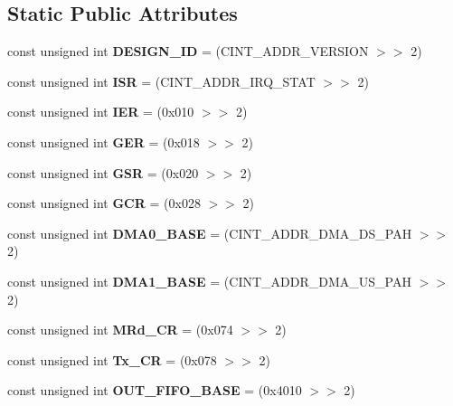 \subsection*{Static Public Attributes}
\begin{CompactItemize}
\item 
\hypertarget{classmprace_1_1ABB_s0}{
const unsigned int {\bf DESIGN\_\-ID} = (CINT\_\-ADDR\_\-VERSION $>$$>$ 2)}
\label{classmprace_1_1ABB_s0}

\item 
\hypertarget{classmprace_1_1ABB_s1}{
const unsigned int {\bf ISR} = (CINT\_\-ADDR\_\-IRQ\_\-STAT $>$$>$ 2)}
\label{classmprace_1_1ABB_s1}

\item 
\hypertarget{classmprace_1_1ABB_s2}{
const unsigned int {\bf IER} = (0x010 $>$$>$ 2)}
\label{classmprace_1_1ABB_s2}

\item 
\hypertarget{classmprace_1_1ABB_s3}{
const unsigned int {\bf GER} = (0x018 $>$$>$ 2)}
\label{classmprace_1_1ABB_s3}

\item 
\hypertarget{classmprace_1_1ABB_s4}{
const unsigned int {\bf GSR} = (0x020 $>$$>$ 2)}
\label{classmprace_1_1ABB_s4}

\item 
\hypertarget{classmprace_1_1ABB_s5}{
const unsigned int {\bf GCR} = (0x028 $>$$>$ 2)}
\label{classmprace_1_1ABB_s5}

\item 
\hypertarget{classmprace_1_1ABB_s6}{
const unsigned int {\bf DMA0\_\-BASE} = (CINT\_\-ADDR\_\-DMA\_\-DS\_\-PAH $>$$>$ 2)}
\label{classmprace_1_1ABB_s6}

\item 
\hypertarget{classmprace_1_1ABB_s7}{
const unsigned int {\bf DMA1\_\-BASE} = (CINT\_\-ADDR\_\-DMA\_\-US\_\-PAH $>$$>$ 2)}
\label{classmprace_1_1ABB_s7}

\item 
\hypertarget{classmprace_1_1ABB_s8}{
const unsigned int {\bf MRd\_\-CR} = (0x074 $>$$>$ 2)}
\label{classmprace_1_1ABB_s8}

\item 
\hypertarget{classmprace_1_1ABB_s9}{
const unsigned int {\bf Tx\_\-CR} = (0x078 $>$$>$ 2)}
\label{classmprace_1_1ABB_s9}

\item 
\hypertarget{classmprace_1_1ABB_s10}{
const unsigned int {\bf OUT\_\-FIFO\_\-BASE} = (0x4010 $>$$>$ 2)}
\label{classmprace_1_1ABB_s10}


\end{CompactItemize}
